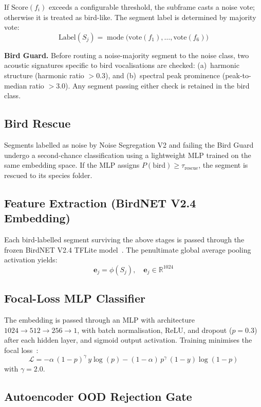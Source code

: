 \documentclass[a4paper,12pt]{article}
\begin{document}
If $\mathrm{Score}(f_i)$ exceeds a configurable threshold, the subframe casts a noise vote;
otherwise it is treated as bird-like. The segment label is determined by majority vote:
\[
    \mathrm{Label}(S_j) = \operatorname{mode}\bigl(\mathrm{vote}(f_1), \ldots, \mathrm{vote}(f_6)\bigr)
\]

\noindent
\textbf{Bird Guard.} Before routing a noise-majority segment to the noise class, two acoustic
signatures specific to bird vocalisations are checked: (a)~harmonic structure (harmonic ratio
$> 0.3$), and (b)~spectral peak prominence (peak-to-median ratio $> 3.0$). Any segment passing
either check is retained in the bird class.

\subsection{Bird Rescue}

\noindent
Segments labelled as noise by Noise Segregation V2 and failing the Bird Guard undergo a
second-chance classification using a lightweight MLP trained on the same embedding space.
If the MLP assigns $P(\mathrm{bird}) \geq \tau_{\mathrm{rescue}}$, the segment is rescued
to its species folder.

\subsection{Feature Extraction (BirdNET V2.4 Embedding)}

\noindent
Each bird-labelled segment surviving the above stages is passed through the frozen BirdNET
V2.4 TFLite model~\cite{BirdNET}. The penultimate global average pooling activation yields:
\[
    \mathbf{e}_j = \phi(S_j), \quad \mathbf{e}_j \in \mathbb{R}^{1024}
\]

\subsection{Focal-Loss MLP Classifier}

\noindent
The embedding is passed through an MLP with architecture $1024 \to 512 \to 256 \to 1$,
with batch normalisation, ReLU, and dropout ($p = 0.3$) after each hidden layer, and
sigmoid output activation. Training minimises the focal loss~\cite{FocalLoss}:
\[
    \mathcal{L} = -\alpha\,(1-p)^{\gamma}\,y\log(p)
                  - (1-\alpha)\,p^{\gamma}\,(1-y)\log(1-p)
\]
with $\gamma = 2.0$.

\subsection{Autoencoder OOD Rejection Gate}
\end{document}
